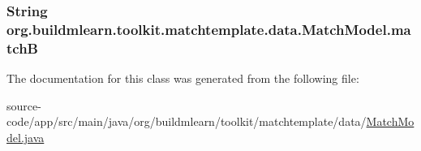 \subsubsection[{\texorpdfstring{matchB}{matchB}}]{\setlength{\rightskip}{0pt plus 5cm}String org.\+buildmlearn.\+toolkit.\+matchtemplate.\+data.\+Match\+Model.\+matchB\hspace{0.3cm}{\ttfamily [private]}}\hypertarget{classorg_1_1buildmlearn_1_1toolkit_1_1matchtemplate_1_1data_1_1MatchModel_a94424270b35968f4b95514d22c157716}{}\label{classorg_1_1buildmlearn_1_1toolkit_1_1matchtemplate_1_1data_1_1MatchModel_a94424270b35968f4b95514d22c157716}


The documentation for this class was generated from the following file\+:\begin{DoxyCompactItemize}
\item 
source-\/code/app/src/main/java/org/buildmlearn/toolkit/matchtemplate/data/\hyperlink{matchtemplate_2data_2MatchModel_8java}{Match\+Model.\+java}\end{DoxyCompactItemize}

